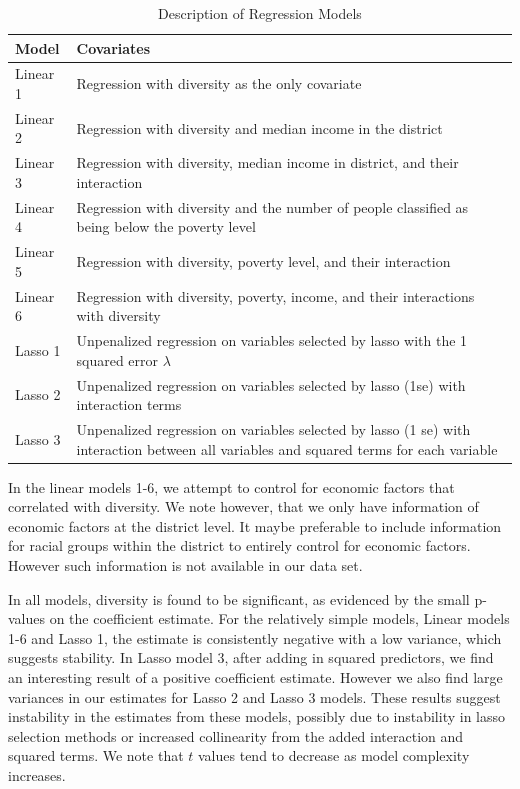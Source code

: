 \documentclass{article}
\begin{document}
\begin{table}
\caption{Description of Regression Models}
\label{modeldesc}
\centering
\begin{tabularx}{\textwidth}{l X}
\hline
Model & Covariates \\
\hline
Linear 1 & Regression with diversity as the only covariate \\
Linear 2 & Regression with diversity and median income in the district \\
Linear 3 & Regression with diversity, median income in district, and their interaction \\
Linear 4 & Regression with diversity and the number of people classified as being below the poverty level \\
Linear 5 & Regression with diversity, poverty level, and their interaction \\
Linear 6 & Regression with diversity, poverty, income, and their interactions with diversity \\
\hline
Lasso 1 & Unpenalized regression on variables selected by lasso with the 1 squared error $\lambda$ \\
Lasso 2 & Unpenalized regression on variables selected by lasso (1se) with interaction terms \\
Lasso 3 & Unpenalized regression on variables selected by lasso (1 se) with interaction between all variables and squared terms for each variable \\
\hline
\end{tabularx}
\end{table}

In the linear models 1-6, we attempt to control for economic factors that correlated with diversity. We note however, that we only have information of economic factors at the district level. It maybe preferable to include information for racial groups within the district to entirely control for economic factors. However such information is not available in our data set. 

In all models, diversity is found to be significant, as evidenced by the small p-values on the coefficient estimate. For the relatively simple models, Linear models 1-6 and Lasso 1, the estimate is consistently negative with a low variance, which suggests stability. In Lasso model 3, after adding in squared predictors, we find an interesting result of a positive coefficient estimate. However we also find large variances in our estimates for Lasso 2 and Lasso 3 models. These results suggest instability in the estimates from these models, possibly due to instability in lasso selection methods or increased collinearity from the added interaction and squared terms. We note that $t$ values tend to decrease as model complexity increases.
\end{document}
